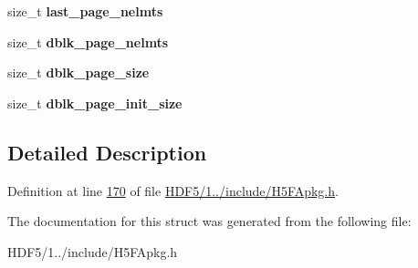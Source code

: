 \begin{DoxyCompactItemize}
size\+\_\+t {\bfseries last\+\_\+page\+\_\+nelmts}
\item 
\mbox{\label{struct_h5_f_a__dblock__t_a546100fe5703702144be1d34b5dfc305}} 
size\+\_\+t {\bfseries dblk\+\_\+page\+\_\+nelmts}
\item 
\mbox{\label{struct_h5_f_a__dblock__t_aaab7fecd4b1f436f8c45858c2cf3c5ab}} 
size\+\_\+t {\bfseries dblk\+\_\+page\+\_\+size}
\item 
\mbox{\label{struct_h5_f_a__dblock__t_af95c9329e73d7d21ea56f270b350c976}} 
size\+\_\+t {\bfseries dblk\+\_\+page\+\_\+init\+\_\+size}
\end{DoxyCompactItemize}


\subsection{Detailed Description}


Definition at line \hyperlink{_h_d_f5_21_810_81_2include_2_h5_f_apkg_8h_source_l00170}{170} of file \hyperlink{_h_d_f5_21_810_81_2include_2_h5_f_apkg_8h_source}{H\+D\+F5/1../include/\+H5\+F\+Apkg.\+h}.



The documentation for this struct was generated from the following file\+:\begin{DoxyCompactItemize}
\item 
H\+D\+F5/1../include/\+H5\+F\+Apkg.\+h\end{DoxyCompactItemize}
